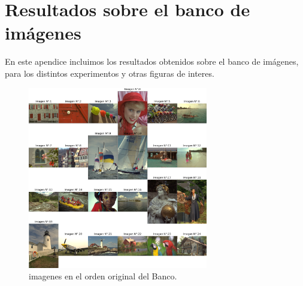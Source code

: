 \chapter{Resultados sobre el banco de im\'agenes}\label{appA}

En este apendice incluimos los resultados obtenidos sobre el banco de im\'agenes, para los distintos experimentos y otras figuras de interes. 


\begin{figure}[H]
    \centering
    \includegraphics[width=0.7\textwidth]{figuras/all_images_in_order.png}
    \caption{imagenes en el orden original del Banco.}
\end{figure}


